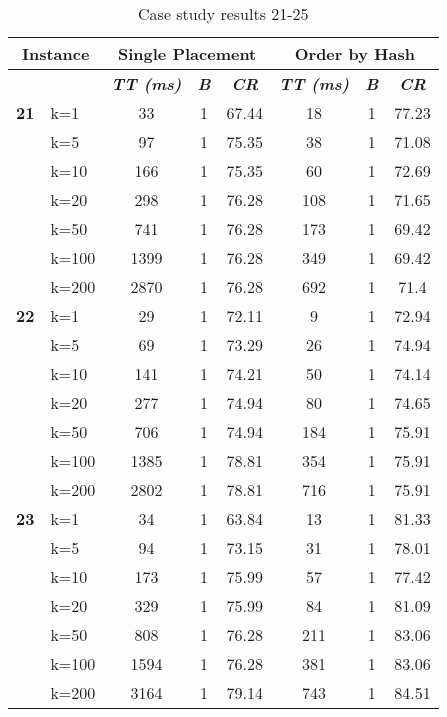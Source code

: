     \begin{table}[htbp]
    \caption{Case study results 21-25}
    \centering
    \begin{tabular}{|l|l|c|c|c|c|c|c|}
    \hline
    \multicolumn{ 2}{|c|}{\textbf{Instance}} & \multicolumn{ 3}{c|}{\textbf{Single Placement}} & \multicolumn{ 3}{c|}{\textbf{Order by Hash}} \\ \hline
    \multicolumn{ 2}{|l|}{} & \textbf{\textit{TT (ms)}} & \textbf{\textit{B}} & \textbf{\textit{CR}} & \textbf{\textit{TT (ms)}} & \textbf{\textit{B}} & \textbf{\textit{CR}} \\ \hline
    \multicolumn{1}{|r|}{\textbf{21}} & k=1 & 33 & 1 & 67.44 & 18 & 1 & 77.23 \\ 
     & k=5 & 97 & 1 & 75.35 & 38 & 1 & 71.08 \\ 
     & k=10 & 166 & 1 & 75.35 & 60 & 1 & 72.69 \\ 
     & k=20 & 298 & 1 & 76.28 & 108 & 1 & 71.65 \\ 
     & k=50 & 741 & 1 & 76.28 & 173 & 1 & 69.42 \\ 
     & k=100 & 1399 & 1 & 76.28 & 349 & 1 & 69.42 \\ 
     & k=200 & 2870 & 1 & 76.28 & 692 & 1 & 71.4 \\ \hline
    \multicolumn{1}{|r|}{\textbf{22}} & k=1 & 29 & 1 & 72.11 & 9 & 1 & 72.94 \\ 
     & k=5 & 69 & 1 & 73.29 & 26 & 1 & 74.94 \\ 
     & k=10 & 141 & 1 & 74.21 & 50 & 1 & 74.14 \\ 
     & k=20 & 277 & 1 & 74.94 & 80 & 1 & 74.65 \\ 
     & k=50 & 706 & 1 & 74.94 & 184 & 1 & 75.91 \\ 
     & k=100 & 1385 & 1 & 78.81 & 354 & 1 & 75.91 \\ 
     & k=200 & 2802 & 1 & 78.81 & 716 & 1 & 75.91 \\ \hline
    \multicolumn{1}{|r|}{\textbf{23}} & k=1 & 34 & 1 & 63.84 & 13 & 1 & 81.33 \\ 
     & k=5 & 94 & 1 & 73.15 & 31 & 1 & 78.01 \\ 
     & k=10 & 173 & 1 & 75.99 & 57 & 1 & 77.42 \\ 
     & k=20 & 329 & 1 & 75.99 & 84 & 1 & 81.09 \\ 
     & k=50 & 808 & 1 & 76.28 & 211 & 1 & 83.06 \\ 
     & k=100 & 1594 & 1 & 76.28 & 381 & 1 & 83.06 \\ 
     & k=200 & 3164 & 1 & 79.14 & 743 & 1 & 84.51 \\ \hline

\end{tabular}
\end{table}
